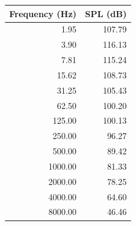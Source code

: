 \documentclass[onecolumn,10pt]{jhwhw}
\begin{document}
\begin{multicols}{2}
\begin{tabular}{rr}
\toprule
Frequency (Hz) &         SPL (dB) \\
\midrule
   1.95 &  107.79 \\
   3.90 &  116.13 \\
   7.81 &  115.24 \\
  15.62 &  108.73 \\
  31.25 &  105.43 \\
  62.50 &  100.20 \\
 125.00 &  100.13 \\
 250.00 &   96.27 \\
 500.00 &   89.42 \\
1000.00 &   81.33 \\
2000.00 &   78.25 \\
4000.00 &   64.60 \\
8000.00 &   46.46 \\
\bottomrule
\end{tabular}
\end{multicols}

\clearpage

\end{document}
